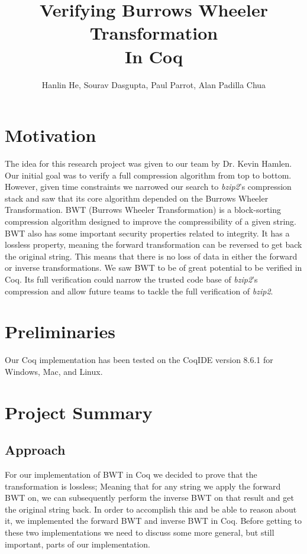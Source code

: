 \documentclass[11pt,letterpaper,]{article}
\title{Verifying Burrows Wheeler Transformation\\ In Coq}
\author{Hanlin He, Sourav Dasgupta, Paul Parrot, Alan Padilla Chua}
\begin{document}
\maketitle

\section{Motivation}

The idea for this research project was given to our team by Dr. Kevin Hamlen.
Our initial goal was to verify a full compression algorithm from top to bottom.
However, given time constraints we narrowed our search to \emph{bzip2}'s
compression stack and saw that its core algorithm depended on the Burrows
Wheeler Transformation\cite{bzip2}. BWT (Burrows Wheeler Transformation) is a
block-sorting compression algorithm designed to improve the compressibility of
a given string. BWT also has some important security properties related to
integrity. It has a lossless property, meaning the forward transformation can
be reversed to get back the original string. This means that there is no loss
of data in either the forward or inverse transformations. We saw BWT to be of
great potential to be verified in Coq. Its full verification could narrow the
trusted code base of \emph{bzip2}'s compression and allow future teams to
tackle the full verification of \emph{bzip2}.

\section{Preliminaries}

Our Coq implementation has been tested on the CoqIDE version 8.6.1 for Windows,
Mac, and Linux.

\section{Project Summary}

\subsection{Approach}

For our implementation of BWT in Coq we decided to prove that the
transformation is lossless; Meaning that for any string we apply the forward
BWT on, we can subsequently perform the inverse BWT on that result and get the
original string back. In order to accomplish this and be able to reason about
it, we implemented the forward BWT and inverse BWT in Coq. Before getting to
these two implementations we need to discuss some more general, but still
important, parts of our implementation.
\end{document}
